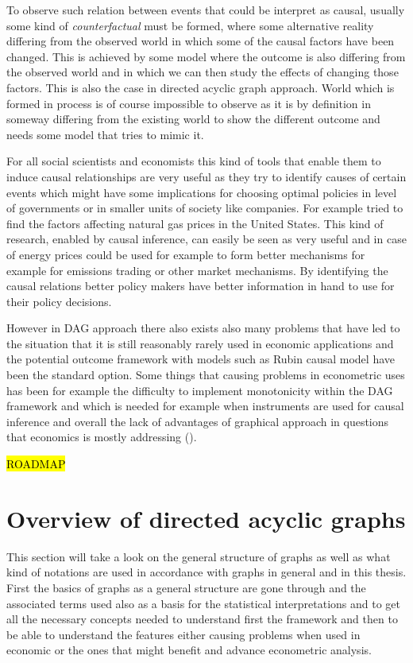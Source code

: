 \documentclass[main=english,12pt,a4paper,pdftex,econ,utf8]{aaltothesis}
\begin{document}
To observe such relation between events that could be interpret as causal, usually some kind of \textit{counterfactual} must be formed, where some alternative reality differing from the observed world in which some of the causal factors have been changed. This is achieved by some model where the outcome is also differing from the observed world and in which we can then study the effects of changing those factors. This is also the case in directed acyclic graph approach. World which is formed in process is of course impossible to observe as it is by definition in someway differing from the existing world to show the different outcome and needs some model that tries to mimic it.

For all social scientists and economists this kind of tools that enable them to induce causal relationships are very useful as they try to identify causes of certain events which might have some implications for choosing optimal policies in level of governments or in smaller units of society like companies. For example \cite{Ji2018} tried to find the factors affecting natural gas prices in the United States. This kind of research, enabled by causal inference, can easily be seen as very useful and in case of energy prices could be used for example to form better mechanisms for example for emissions trading or other market mechanisms. By identifying the causal relations better policy makers have better information in hand to use for their policy decisions. 

However in DAG approach there also exists also many problems that have led to the situation that it is still reasonably rarely used in economic applications and the potential outcome framework with models such as Rubin causal model have been the standard option. Some things that causing problems in econometric uses has been for example the difficulty to implement monotonicity within the DAG framework and which is needed for example when instruments are used for causal inference and overall the lack of advantages of graphical approach in questions that economics is mostly addressing (\cite{Imbens2014}).

\noindent \hl{ROADMAP}

\clearpage

\section{Overview of directed acyclic graphs} \label{section:overview}

This section will take a look on the general structure of graphs as well as what kind of notations are used in accordance with graphs in general and in this thesis. First the basics of graphs as a general structure are gone through and the associated terms used also as a basis for the statistical interpretations and to get all the necessary concepts needed to understand first the framework and then to be able to understand the features either causing problems when used in economic or the ones that might benefit and advance econometric analysis. 
\end{document}
